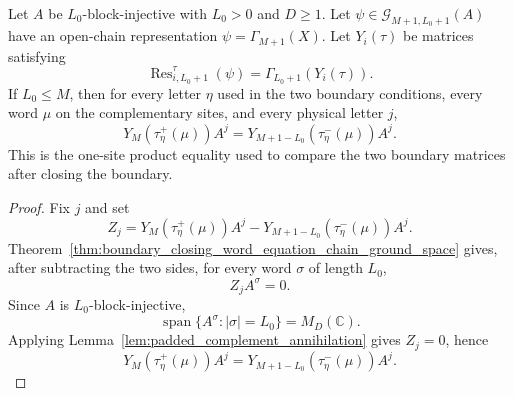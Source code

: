 \begin{theorem}
    \label{thm:boundary_closing_right_products_chain_ground_space}
    \leanok
    Let $A$ be $L_0$-block-injective with $L_0>0$ and $D\ge1$. Let
    $\psi\in\mathcal G_{M+1,L_0+1}(A)$ have an open-chain representation
    $\psi=\Gamma_{M+1}(X)$.  Let $Y_i(\tau)$ be matrices satisfying
    \[
        \operatorname{Res}^{\tau}_{i,L_0+1}(\psi)
        =
        \Gamma_{L_0+1}(Y_i(\tau)).
    \]
    If $L_0\le M$, then for every
    letter $\eta$ used in the two boundary conditions, every word $\mu$ on
    the complementary sites, and every physical letter $j$,
    \[
        Y_M(\tau^{+}_{\eta}(\mu))A^j
        =
        Y_{M+1-L_0}(\tau^{-}_{\eta}(\mu))A^j.
    \]
    This is the one-site product equality used to compare the two boundary
    matrices after closing the boundary.
\end{theorem}

\begin{proof}
    \notready
    Fix $j$ and set
    \[
        Z_j=
        Y_M(\tau^{+}_{\eta}(\mu))A^j
        -
        Y_{M+1-L_0}(\tau^{-}_{\eta}(\mu))A^j .
    \]
    Theorem~\ref{thm:boundary_closing_word_equation_chain_ground_space}
    gives, after subtracting the two sides, for every word $\sigma$ of length $L_0$,
    \[
        Z_jA^\sigma=0.
    \]
    Since $A$ is $L_0$-block-injective,
    \[
        \operatorname{span}\{A^\sigma:|\sigma|=L_0\}=M_D(\mathbb C).
    \]
    Applying Lemma~\ref{lem:padded_complement_annihilation} gives $Z_j=0$, hence
    \[
        Y_M(\tau^{+}_{\eta}(\mu))A^j
        =
        Y_{M+1-L_0}(\tau^{-}_{\eta}(\mu))A^j.
    \]
\end{proof}

